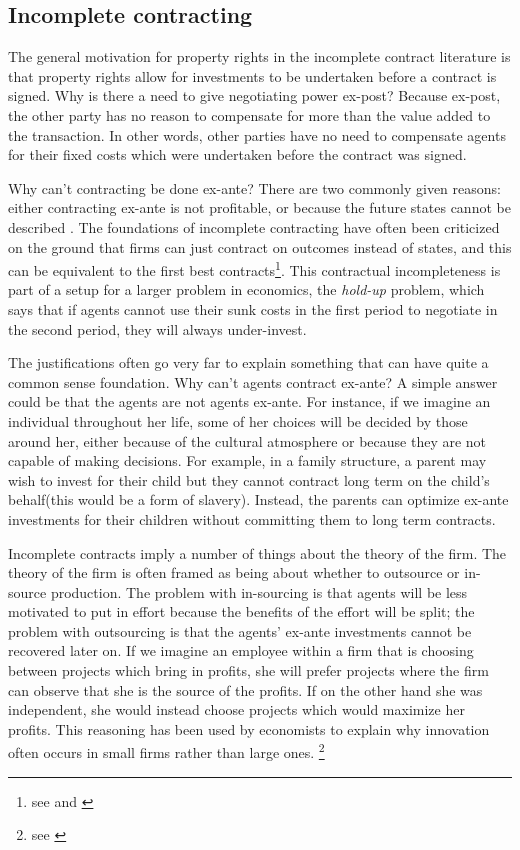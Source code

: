 \documentclass[12pt]{report}
\numberwithin{equation}{section}
\begin{document}
\subsection{Incomplete contracting} \label{incomplete}

The general motivation for property rights in the incomplete contract literature is that property rights allow for investments to be undertaken before a contract is signed. Why is there a need to give negotiating power ex-post? Because ex-post, the other party has no reason to compensate for more than the value added to the transaction. In other words, other parties have no need to compensate agents for their fixed costs which were undertaken before the contract was signed.

Why can't contracting be done ex-ante? There are two commonly given reasons: either contracting ex-ante is not profitable, or because the future states cannot be described \citep{Hart1999}. The foundations of incomplete contracting have often been criticized on the ground that firms can just contract on outcomes instead of states, and this can be equivalent to the first best contracts\footnote{see \cite{Maskin2002} and \cite{maskin1999unforeseen}}. This contractual incompleteness is part of a setup for a larger problem in economics, the \textit{hold-up} problem, which says that if agents cannot use their sunk costs in the first period to negotiate in the second period, they will always under-invest.

The justifications often go very far to explain something that can have quite a common sense foundation. Why can't agents contract ex-ante? A simple answer could be that the agents are not agents ex-ante. For instance, if we imagine an individual throughout her life, some of her choices will be decided by those around her, either because of the cultural atmosphere or because they are not capable of making decisions. For example, in a family structure, a parent may wish to invest for their child but they cannot contract long term on the child's behalf(this would be a form of slavery). Instead, the parents can optimize ex-ante investments for their children without committing them to long term contracts.

Incomplete contracts imply a number of things about the theory of the firm. The theory of the firm is often framed as being about whether to outsource or in-source production. The problem with in-sourcing is that agents will be less motivated to put in effort because the benefits of the effort will be split; the problem with outsourcing is that the agents' ex-ante investments cannot be recovered later on. If we imagine an employee within a firm that is choosing between projects which bring in profits, she will prefer projects where the firm can observe that she is the source of the profits. If on the other hand she was independent, she would instead choose projects which would maximize her profits. This reasoning has been used by economists to explain why innovation often occurs in small firms rather than large ones. \footnote{see \cite{Holmstrom1989} }
\end{document}
